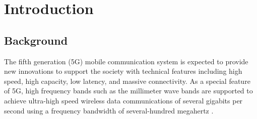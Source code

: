\documentclass[a4paper,12pt]{report}
\begin{document}
\pagestyle{empty}

\begin{center}
  \end{center}
  
  
  \newpage

\renewcommand{\thepage}{\roman{page}}
\cleardoublepage
\pagestyle{fancy}
\lhead{\rightmark}
\tableofcontents
\listoffigures
\listoftables

\cleardoublepage

\chapter{Introduction}

\setcounter{page}{1}
\renewcommand{\thepage}{\arabic{page}}

\section{Background}

The fifth generation (5G) mobile communication system
is expected to provide new innovations to support the society
with technical features including high speed, high
capacity, low latency, and massive connectivity.
As a special feature of 5G,
high frequency bands such as the millimeter
wave bands are supported to achieve ultra-high speed
wireless data communications of several gigabits per second
using a frequency bandwidth of
several-hundred megahertz \cite{docomo_6G_white_paper}.
\end{document}
